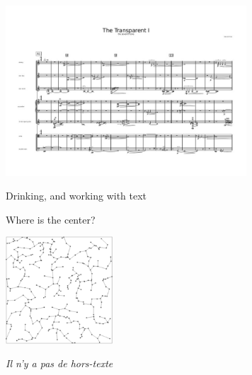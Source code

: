 \documentclass{beamer}
\begin{document}
\begin{frame}
  \begin{center}
    \includegraphics[width=9cm]{./img/transparent.jpg}
  \end{center}
\end{frame}

\begin{frame}
  \begin{center}
    {\huge \color{white} Drinking, and working with text}
  \end{center}
\end{frame}

\begin{frame}
  \begin{center}
    Where is the center?

    \vspace{.2cm}
    \includegraphics[width=4cm]{./img/center.png}
  \end{center}
\end{frame}

\begin{frame}
  \begin{center}
    \emph{Il n'y a pas de hors-texte}
  \end{center}
\end{frame}
\end{document}
